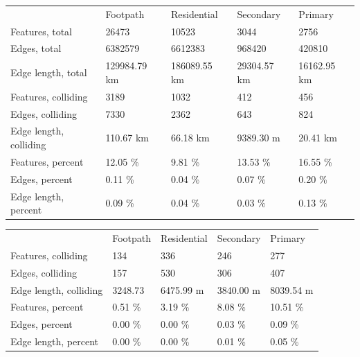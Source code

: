 \documentclass{kththesis}
\begin{document}
\begin{table}[H]
    \begin{tabular}{lllll}
                                & Footpath      & Residential  & Secondary   & Primary     \\
        Features, total         & 26473         & 10523        & 3044        & 2756        \\
        Edges, total            & 6382579       & 6612383      & 968420      & 420810      \\
        Edge length, total      & 129984.79 km  & 186089.55 km & 29304.57 km & 16162.95 km \\
        Features, colliding     & 3189          & 1032         & 412         & 456         \\
        Edges, colliding        & 7330          & 2362         & 643         & 824         \\
        Edge length, colliding  & 110.67 km     & 66.18 km     & 9389.30 m   & 20.41 km    \\
        Features, percent       & 12.05 \%      & 9.81 \%      & 13.53 \%    & 16.55 \%    \\
        Edges, percent          & 0.11 \%       & 0.04 \%      & 0.07 \%     & 0.20 \%     \\
        Edge length, percent    & 0.09 \%       & 0.04 \%      & 0.03 \%     & 0.13 \%

    \end{tabular}
    \label{table:road-collision}
\end{table}

\begin{table}[H]
    \begin{tabular}{lllll}
                                & Footpath      & Residential  & Secondary   & Primary     \\
        Features, colliding     & 134           & 336          & 246         & 277         \\
        Edges, colliding        & 157           & 530          & 306         & 407         \\
        Edge length, colliding  & 3248.73       & 6475.99 m    & 3840.00 m   & 8039.54 m   \\
        Features, percent       & 0.51 \%       & 3.19 \%      & 8.08 \%     & 10.51 \%    \\
        Edges, percent          & 0.00 \%       & 0.00 \%      & 0.03 \%     & 0.09 \%     \\
        Edge length, percent    & 0.00 \%       & 0.00 \%      & 0.01 \%     & 0.05 \%

    \end{tabular}
    \label{table:road-collision-corrected}
\end{table}
\end{document}
